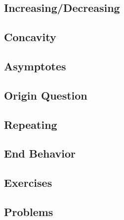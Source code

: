 \subsection{Increasing/Decreasing}
\subsection{Concavity}
\subsection{Asymptotes}
\subsection{Origin Question}
\subsection{Repeating}
\subsection{End Behavior}
\newpage
\subsection{Exercises}

\newpage
{}
\subsection{Problems}
\noindent{}
\newpage
